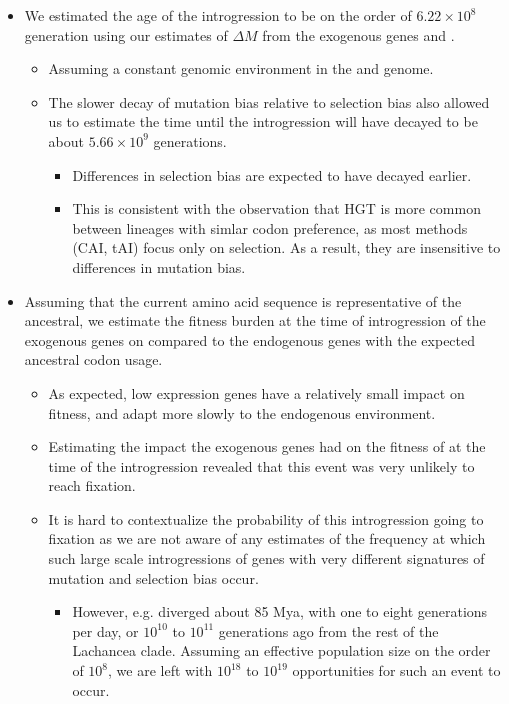 \documentclass[12pt]{article}
\begin{document}
\begin{itemize}
\begin{itemize}
\begin{itemize}
		\end{itemize}
	\end{itemize}
	\item We estimated the age of the introgression to be on the order of  $6.22\times10^8$ generation using our estimates of $\Delta M$ from the exogenous genes and \gossypii.
	\begin{itemize}
		\item Assuming a constant genomic environment in the \kluyveri and \gossypii genome.
		\item The slower decay of mutation bias relative to selection bias also allowed us to estimate the time until the introgression will have decayed to be about $5.66\times10^9$ generations.
		\begin{itemize}
			\item Differences in selection bias are expected to have decayed earlier.
			\item This is consistent with the observation that HGT is more common between lineages with simlar codon preference, as most methods (CAI, tAI) focus only on selection. As a result, they are insensitive to differences in mutation bias.
		\end{itemize}
	\end{itemize}
	\item Assuming that the current amino acid sequence is representative of the ancestral, we estimate the fitness burden at the time of introgression of the exogenous genes on \kluyveri compared to the endogenous genes with the expected ancestral codon usage.
	\begin{itemize}
		\item As expected, low expression genes have a relatively small impact on fitness, and adapt more slowly to the endogenous environment.
		\item Estimating the impact the exogenous genes had on the fitness of \kluyveri at the time of the introgression revealed that this event was very unlikely to reach fixation.
		\item It is hard to contextualize the probability of this introgression going to fixation as we are not aware of any estimates of the frequency at which such large scale introgressions of genes with very different signatures of mutation and selection bias occur.
		\begin{itemize}
			\item However, e.g. \kluyveri diverged about 85 Mya, with one to eight generations per day, or $10^{10}$ to $10^{11}$ generations ago from the rest of the Lachancea clade. Assuming an effective population size on the order of $10^8$, we are left with $10^{18}$ to $10^{19}$ opportunities for such an event to occur.

\end{itemize}
\end{itemize}
\end{itemize}
\end{document}
